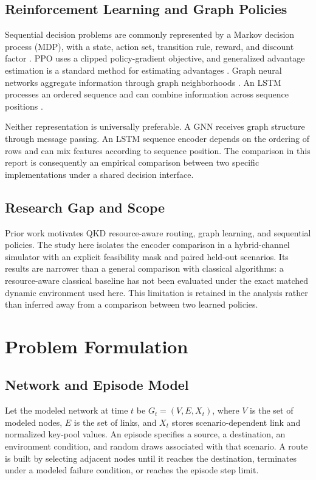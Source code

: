 \documentclass[12pt,a4paper,oneside]{report}
\begin{document}
\section{Reinforcement Learning and Graph Policies}
Sequential decision problems are commonly represented by a Markov decision process (MDP), with a state, action set, transition rule, reward, and discount factor \cite{bellman1957,sutton2018}. PPO uses a clipped policy-gradient objective, and generalized advantage estimation is a standard method for estimating advantages \cite{schulman2017,schulman2016gae}. Graph neural networks aggregate information through graph neighborhoods \cite{kipf2017,hamilton2017,velickovic2018}. An LSTM processes an ordered sequence and can combine information across sequence positions \cite{hochreiter1997}.

Neither representation is universally preferable. A GNN receives graph structure through message passing. An LSTM sequence encoder depends on the ordering of rows and can mix features according to sequence position. The comparison in this report is consequently an empirical comparison between two specific implementations under a shared decision interface.

\section{Research Gap and Scope}
Prior work motivates QKD resource-aware routing, graph learning, and sequential policies. The study here isolates the encoder comparison in a hybrid-channel simulator with an explicit feasibility mask and paired held-out scenarios. Its results are narrower than a general comparison with classical algorithms: a resource-aware classical baseline has not been evaluated under the exact matched dynamic environment used here. This limitation is retained in the analysis rather than inferred away from a comparison between two learned policies.

\chapter{Problem Formulation}

\section{Network and Episode Model}
Let the modeled network at time $t$ be $G_t=(V,E,X_t)$, where $V$ is the set of modeled nodes, $E$ is the set of links, and $X_t$ stores scenario-dependent link and normalized key-pool values. An episode specifies a source, a destination, an environment condition, and random draws associated with that scenario. A route is built by selecting adjacent nodes until it reaches the destination, terminates under a modeled failure condition, or reaches the episode step limit.
\end{document}
